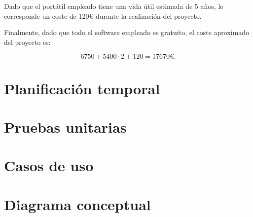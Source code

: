 Dado que el portátil empleado tiene una vida útil estimada de 5 años, le corresponde un coste de 120€ durante la realización del proyecto.

Finalmente, dado que todo el software empleado es gratuito, el coste aproximado del proyecto es:

$$6750+5400\cdot 2+120=17670\text{€}.$$

\section{Planificación temporal}



\section{Pruebas unitarias}



\section{Casos de uso}



\section{Diagrama conceptual}










